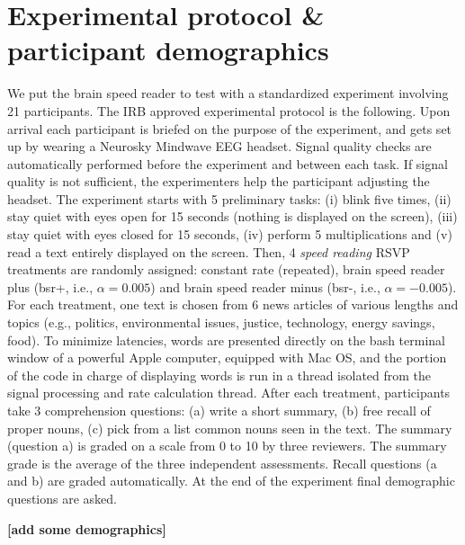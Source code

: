 \section{Experimental protocol \& participant demographics}
\label{exp_protocol}
We put the brain speed reader to test with a standardized experiment involving 21 participants. The IRB approved experimental protocol is the following.
Upon arrival each participant is briefed on the purpose of the experiment, and gets set up by wearing a Neurosky Mindwave EEG headset. Signal quality checks are automatically performed before the experiment and between each task. If signal quality is not sufficient, the experimenters help the participant adjusting the headset. The experiment starts with 5 preliminary tasks: (i) blink five times, (ii) stay quiet with eyes open for 15 seconds (nothing is displayed on the screen), (iii) stay quiet with eyes closed for 15 seconds, (iv) perform 5 multiplications and (v) read a text entirely displayed on the screen. Then, 4 {\it speed reading} RSVP treatments are randomly assigned: constant rate (repeated), brain speed reader plus (bsr+, i.e., $\alpha = 0.005$) and brain speed reader minus (bsr-, i.e., $\alpha = -0.005$). For each treatment, one text is chosen from 6 news articles of various lengths and topics (e.g., politics, environmental issues, justice, technology, energy savings, food). To minimize latencies, words are presented directly on the bash terminal window of a powerful Apple computer, equipped with Mac OS, and the portion of the code in charge of displaying words is run in a thread isolated from the signal processing and rate calculation thread. After each treatment, participants take 3 comprehension questions: (a) write a short summary, (b) free recall of proper nouns, (c) pick from a list common nouns seen in the text. The summary (question a) is graded on a scale from 0 to 10 by three reviewers. The summary grade is the average of the three independent assessments. Recall questions (a and b) are graded automatically. At the end of the experiment final demographic questions are asked.

{\bf [add some demographics]}